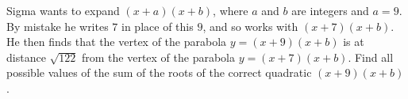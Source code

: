 Sigma wants to expand $(x+a)(x+b)$, where $a$ and $b$ are integers and $a=9$. By mistake he writes $7$ in place of this $9$, and so works with $(x+7)(x+b)$. He then finds that the vertex of the parabola $y=(x+9)(x+b)$ is at distance $\sqrt{122}$ from the vertex of the parabola $y=(x+7)(x+b)$. Find all possible values of the sum of the roots of the correct quadratic $(x+9)(x+b)$.
